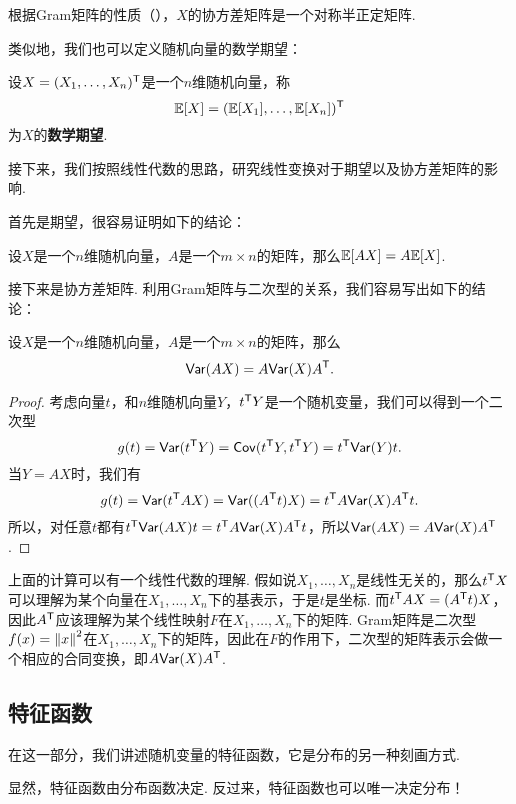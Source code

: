 根据Gram矩阵的性质（），$X$的协方差矩阵是一个对称半正定矩阵. 

类似地，我们也可以定义随机向量的数学期望：

\begin{definition}[随机向量的数学期望]
设$X=(X_1,\dots,X_n)^{\mathsf{T}}$是一个$n$维随机向量，称
\[\mathbb{E}[X]=(\mathbb{E}[X_1],\dots,\mathbb{E}[X_n])^{\mathsf{T}}\]
为$X$的\textbf{数学期望}. 
\end{definition}

接下来，我们按照线性代数的思路，研究线性变换对于期望以及协方差矩阵的影响. 

首先是期望，很容易证明如下的结论：

\begin{theorem}\label{thm:expectation-linear}
设$X$是一个$n$维随机向量，$A$是一个$m\times n$的矩阵，那么$\mathbb{E}[AX]=A\mathbb{E}[X]$.
\end{theorem}

接下来是协方差矩阵. 利用Gram矩阵与二次型的关系，我们容易写出如下的结论：

\begin{theorem}\label{thm:covariance-linear}
设$X$是一个$n$维随机向量，$A$是一个$m\times n$的矩阵，那么
\[\mathsf{Var}(AX)=A\mathsf{Var}(X)A^{\mathsf{T}}.\]
\end{theorem}
\begin{proof}
考虑向量$t$，和$n$维随机向量$Y$，$t^{\mathsf{T}} Y$是一个随机变量，我们可以得到一个二次型
\[g(t)=\mathsf{Var}(t^{\mathsf{T}} Y)=\mathsf{Cov}(t^{\mathsf{T}} Y,t^{\mathsf{T}} Y)=t^{\mathsf{T}}\mathsf{Var}(Y)t.\]
当$Y=AX$时，我们有
\[g(t)=\mathsf{Var}(t^{\mathsf{T}} AX)=\mathsf{Var}((A^{\mathsf{T}} t)X)=t^{\mathsf{T}} A\mathsf{Var}(X)A^{\mathsf{T}} t.\]
所以，对任意$t$都有$t^{\mathsf{T}}\mathsf{Var}(AX)t=t^{\mathsf{T}} A\mathsf{Var}(X)A^{\mathsf{T}} t$，所以$\mathsf{Var}(AX)=A\mathsf{Var}(X)A^{\mathsf{T}}$.
\end{proof}

上面的计算可以有一个线性代数的理解. 假如说$X_1,\dots,X_n$是线性无关的，那么$t^{\mathsf{T}} X$可以理解为某个向量在$X_1,\dots,X_n$下的基表示，于是$t$是坐标. 而$t^{\mathsf{T}} AX=(A^{\mathsf{T}} t)X$，因此$A^{\mathsf{T}}$应该理解为某个线性映射$F$在$X_1,\dots,X_n$下的矩阵. Gram矩阵是二次型$f(x)=\left\|x\right\|^2$在$X_1,\dots,X_n$下的矩阵，因此在$F$的作用下，二次型的矩阵表示会做一个相应的合同变换，即$A\mathsf{Var}(X)A^{\mathsf{T}}$.

\subsection{特征函数} \label{subsec:characteristic-function}

在这一部分，我们讲述随机变量的特征函数，它是分布的另一种刻画方式. 

显然，特征函数由分布函数决定. 反过来，特征函数也可以唯一决定分布！

